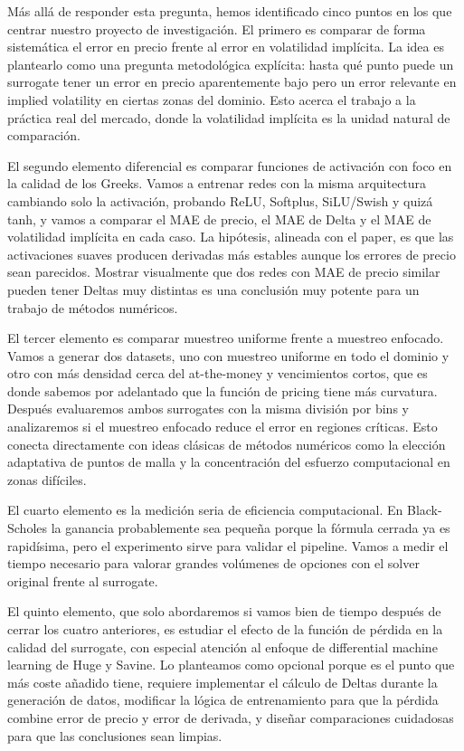 \documentclass[11pt,a4paper]{article}
\begin{document}
Más allá de responder esta pregunta, hemos identificado cinco puntos en los que centrar nuestro proyecto de investigación. El primero es comparar de forma sistemática el error en precio frente al error en volatilidad implícita. La idea es plantearlo como una pregunta metodológica explícita: hasta qué punto puede un surrogate tener un error en precio aparentemente bajo pero un error relevante en implied volatility en ciertas zonas del dominio. Esto acerca el trabajo a la práctica real del mercado, donde la volatilidad implícita es la unidad natural de comparación.

El segundo elemento diferencial es comparar funciones de activación con foco en la calidad de los Greeks. Vamos a entrenar redes con la misma arquitectura cambiando solo la activación, probando ReLU, Softplus, SiLU/Swish y quizá tanh, y vamos a comparar el MAE de precio, el MAE de Delta y el MAE de volatilidad implícita en cada caso. La hipótesis, alineada con el paper, es que las activaciones suaves producen derivadas más estables aunque los errores de precio sean parecidos. Mostrar visualmente que dos redes con MAE de precio similar pueden tener Deltas muy distintas es una conclusión muy potente para un trabajo de métodos numéricos.

El tercer elemento es comparar muestreo uniforme frente a muestreo enfocado. Vamos a generar dos datasets, uno con muestreo uniforme en todo el dominio y otro con más densidad cerca del at-the-money y vencimientos cortos, que es donde sabemos por adelantado que la función de pricing tiene más curvatura. Después evaluaremos ambos surrogates con la misma división por bins y analizaremos si el muestreo enfocado reduce el error en regiones críticas. Esto conecta directamente con ideas clásicas de métodos numéricos como la elección adaptativa de puntos de malla y la concentración del esfuerzo computacional en zonas difíciles.

El cuarto elemento es la medición seria de eficiencia computacional. En Black-Scholes la ganancia probablemente sea pequeña porque la fórmula cerrada ya es rapidísima, pero el experimento sirve para validar el pipeline. Vamos a medir el tiempo necesario para valorar grandes volúmenes de opciones con el solver original frente al surrogate.

El quinto elemento, que solo abordaremos si vamos bien de tiempo después de cerrar los cuatro anteriores, es estudiar el efecto de la función de pérdida en la calidad del surrogate, con especial atención al enfoque de differential machine learning de Huge y Savine. Lo planteamos como opcional porque es el punto que más coste añadido tiene, requiere implementar el cálculo de Deltas durante la generación de datos, modificar la lógica de entrenamiento para que la pérdida combine error de precio y error de derivada, y diseñar comparaciones cuidadosas para que las conclusiones sean limpias.
\end{document}
